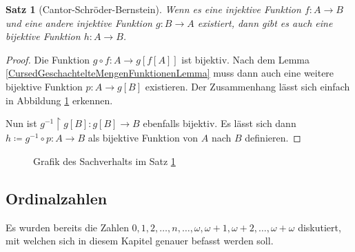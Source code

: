 \documentclass[german]{article}
\theoremstyle{break}
\theoremstyle{def_style}
\theoremstyle{def_style}
\newtheorem{satz}{Satz}[section]
\theoremstyle{lemma_style}
\begin{document}
\begin{satz}[Cantor-Schröder-Bernstein]
	Wenn es eine injektive Funktion $f:A\to B$ und eine andere injektive Funktion $g : B\to A$ existiert, dann gibt es auch eine bijektive Funktion $h:A\to B$.
	\label{SatzCantorSchroederBernstein}
\end{satz}
\begin{proof}
	Die Funktion $g\circ f : A \to g[f[A]]$ ist bijektiv. Nach dem Lemma \ref{CursedGeschachtelteMengenFunktionenLemma} muss dann auch eine weitere bijektive Funktion $p: A \to g[B]$ existieren. Der Zusammenhang lässt sich einfach in Abbildung \ref{CantorSchroederBernsteinGrafik} erkennen. 
	
	Nun ist $g^{-1}\upharpoonright g[B] : g[B]\to B$ ebenfalls bijektiv. Es lässt sich dann $h\coloneqq g^{-1}\circ p : A\to B$ als bijektive Funktion von $A$ nach $B$ definieren. 
\end{proof}

\begin{figure}[h]
	\begin{center}
	\end{center}
	\caption{Grafik des Sachverhalts im Satz \ref{SatzCantorSchroederBernstein}}
	\label{CantorSchroederBernsteinGrafik}
\end{figure}


\subsection{Ordinalzahlen}

Es wurden bereits die Zahlen $0,1,2,\dots,n,\dots,\omega,\omega+1,\omega+2,\dots,\omega+\omega$ diskutiert, mit welchen sich in diesem Kapitel genauer befasst werden soll.
\end{document}
